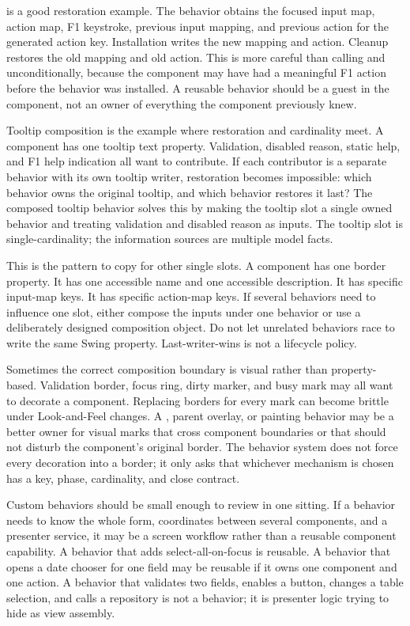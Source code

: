  is a good restoration example. The behavior obtains the focused
input map, action map, F1 keystroke, previous input mapping, and previous action
for the generated action key. Installation writes the new mapping and action.
Cleanup restores the old mapping and old action. This is more careful than
calling  and  unconditionally,
because the component may have had a meaningful F1 action before the behavior
was installed. A reusable behavior should be a guest in the component, not an
owner of everything the component previously knew.

Tooltip composition is the example where restoration and cardinality meet. A
component has one tooltip text property. Validation, disabled reason, static
help, and F1 help indication all want to contribute. If each contributor is a
separate behavior with its own tooltip writer, restoration becomes impossible:
which behavior owns the original tooltip, and which behavior restores it last?
The composed tooltip behavior solves this by making the tooltip slot a single
owned behavior and treating validation and disabled reason as inputs. The
tooltip slot is single-cardinality; the information sources are multiple model
facts.

This is the pattern to copy for other single slots. A component has one border
property. It has one accessible name and one accessible description. It has
specific input-map keys. It has specific action-map keys. If several behaviors
need to influence one slot, either compose the inputs under one behavior or use
a deliberately designed composition object. Do not let unrelated behaviors
race to write the same Swing property. Last-writer-wins is not a lifecycle
policy.

Sometimes the correct composition boundary is visual rather than property-based.
Validation border, focus ring, dirty marker, and busy mark may all want to
decorate a component. Replacing borders for every mark can become brittle under
Look-and-Feel changes. A , parent overlay, or painting behavior may
be a better owner for visual marks that cross component boundaries or that
should not disturb the component's original border. The behavior system does
not force every decoration into a border; it only asks that whichever mechanism
is chosen has a key, phase, cardinality, and close contract.

Custom behaviors should be small enough to review in one sitting. If a behavior
needs to know the whole form, coordinates between several components, and a
presenter service, it may be a screen workflow rather than a reusable component
capability. A behavior that adds select-all-on-focus is reusable. A behavior
that opens a date chooser for one field may be reusable if it owns one
component and one action. A behavior that validates two fields, enables a
button, changes a table selection, and calls a repository is not a behavior; it
is presenter logic trying to hide as view assembly.

